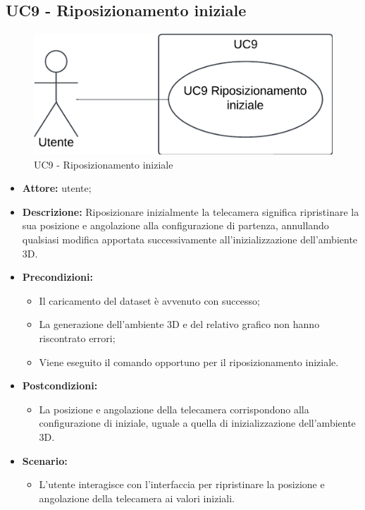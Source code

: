 \subsection{UC9 - Riposizionamento iniziale}
\begin{figure}[h!]\centering
    \includegraphics[scale=0.7]{template/images/UC9.png}
    \caption{UC9 - Riposizionamento iniziale}
\end{figure}
\begin{itemize}    
    \item \textbf{Attore:} utente;
    \item \textbf{Descrizione:} Riposizionare inizialmente la telecamera significa ripristinare la sua posizione e angolazione alla configurazione di partenza, annullando qualsiasi modifica apportata successivamente all'inizializzazione dell'ambiente 3D.
    \item \textbf{Precondizioni:}    
        \begin{itemize}
            \item Il caricamento del dataset è avvenuto con successo;
            \item La generazione dell'ambiente 3D e del relativo grafico non hanno riscontrato errori;
            \item Viene eseguito il comando opportuno per il riposizionamento iniziale.
        \end{itemize}    
    \item \textbf{Postcondizioni:}
        \begin{itemize}
            \item La posizione e angolazione della telecamera corrispondono alla configurazione di iniziale, uguale a quella di inizializzazione dell'ambiente 3D.
        \end{itemize}    
    \item \textbf{Scenario:} 
        \begin{itemize}
            \item L'utente interagisce con l'interfaccia per ripristinare la posizione e angolazione della telecamera ai valori iniziali.
        \end{itemize}
\end{itemize}


